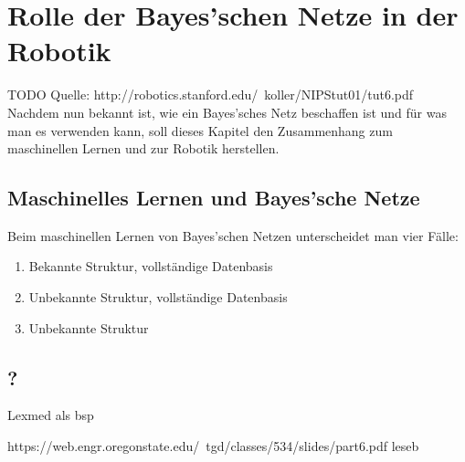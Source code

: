 \chapter{Rolle der Bayes'schen Netze in der Robotik}
TODO Quelle: http://robotics.stanford.edu/~koller/NIPStut01/tut6.pdf
Nachdem nun bekannt ist, wie ein Bayes'sches Netz beschaffen ist und für was man es verwenden kann, soll dieses Kapitel den Zusammenhang zum maschinellen Lernen und zur Robotik herstellen.
\section{Maschinelles Lernen und Bayes'sche Netze}
Beim maschinellen Lernen von Bayes'schen Netzen unterscheidet man vier Fälle:
\begin{enumerate}

\item Bekannte Struktur, vollständige Datenbasis
\item Unbekannte Struktur, vollständige Datenbasis
\item Unbekannte Struktur 
\end{enumerate}

\section{?}

Lexmed als bsp

https://web.engr.oregonstate.edu/~tgd/classes/534/slides/part6.pdf leseb